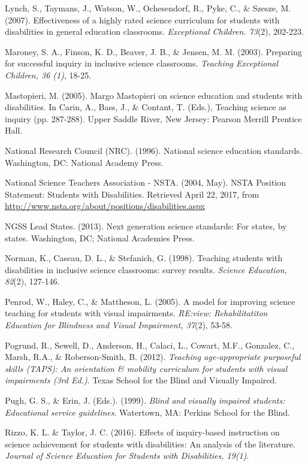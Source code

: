 \documentclass[11.5pt]{sig-alternate} %
\begin{document}
Lynch, S., Taymans, J., Watson, W., Ochesendorf, R., Pyke, C., \& Szesze, M.  (2007). Effectiveness of a highly rated science curriculum for students with disabilities in general education classrooms.  \textit{Exceptional Children. 73}(2), 202-223.
 
Maroney, S. A., Finson, K. D., Beaver, J. B., \& Jensen, M. M. (2003). Preparing for successful inquiry in inclusive science classrooms.  \textit{Teaching Exceptional Children, 36 (1)}, 18-25.

Mastopieri, M. (2005). Margo Mastopieri on science education and students with disabilities. In Carin, A., Bass, J., \& Contant, T. (Eds.), Teaching science as inquiry (pp. 287-288).  Upper Saddle River, New Jersey: Pearson Merrill Prentice Hall.

National Research Council (NRC). (1996). National science education standards.  Washington, DC:  National Academy Press.

National Science Teachers Association - NSTA. (2004, May). NSTA Position Statement:  Students with Disabilities. Retrieved April 22, 2017, from \url{http://www.nsta.org/about/positions/disabilities.aspx}

NGSS Lead States. (2013). Next generation science standards: For states, by states. 	Washington, DC; National Academies Press.

Norman, K., Caseau, D. L., \& Stefanich, G. (1998). Teaching students with disabilities in inclusive science classrooms: survey results. \textit{Science Education, 82}(2), 127-146.

Penrod, W., Haley, C., \& Mattheson, L. (2005). A model for improving science teaching for students with visual impairments. \textit{RE:view: Rehabilitatiton Education for Blindness and Visual Impairment, 37}(2), 53-58.

Pogrund, R., Sewell, D., Anderson, H., Calaci, L., Cowart, M.F., Gonzalez, C., Marsh, R.A., \& Roberson-Smith, B. (2012). \textit{Teaching age-appropriate purposeful skills (TAPS):  An orientation \& mobility curriculum for students with visual impairments (3rd Ed.)}.  Texas 	School for the Blind and Visually Impaired.

Pugh, G. S., \& Erin, J. (Eds.). (1999). \textit{Blind and visually impaired students:  Educational service guidelines}. Watertown, MA:  Perkins School for the Blind.

Rizzo, K. L. \& Taylor, J. C. (2016). Effects of inquiry-based instruction on science achievement for students with disabilities:  An analysis of the literature.  \textit{Journal of Science Education for Students with Disabilities, 19(1)}.
\end{document}
